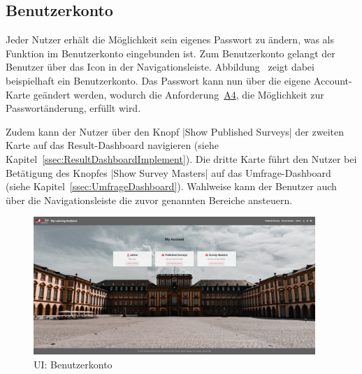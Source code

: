 
\subsection{Benutzerkonto}
\label{ssec:Benutzerkonto}

Jeder Nutzer erhält die Möglichkeit sein eigenes Passwort zu ändern, was als Funktion im Benutzerkonto eingebunden ist.
Zum Benutzerkonto gelangt der Benutzer über das Icon \faUser[regular]\xspace in der Navigationsleiste.
Abbildung~ zeigt dabei beispielhaft ein Benutzerkonto.
Das Passwort kann nun über die eigene Account-Karte geändert werden, wodurch die Anforderung~\hyperref[Anf:A4]{A4}, die Möglichkeit zur Passwortänderung, erfüllt wird.

Zudem kann der Nutzer über den Knopf \jinline|Show Published Surveys| der zweiten Karte auf das Result-Dashboard navigieren (siehe Kapitel~\vref{ssec:ResultDashboardImplement}).
Die dritte Karte führt den Nutzer bei Betätigung des Knopfes \jinline|Show Survey Masters| auf das Umfrage-Dashboard (siehe Kapitel~\vref{ssec:UmfrageDashboard}).
Wahlweise kann der Benutzer auch über die Navigationsleiste die zuvor genannten Bereiche ansteuern.

\begin{figure}[hp]
	\centering
	\includegraphics[width=0.95\textwidth, keepaspectratio]{img/client/Account.png}
	\captionsetup{justification=centering, format=plain}
	\caption[\acl{UI}: Benutzerkonto]{\acl{UI}: Benutzerkonto \\ \quelleScreenshot}
	\label{fig:AccountImplement}
\end{figure}
